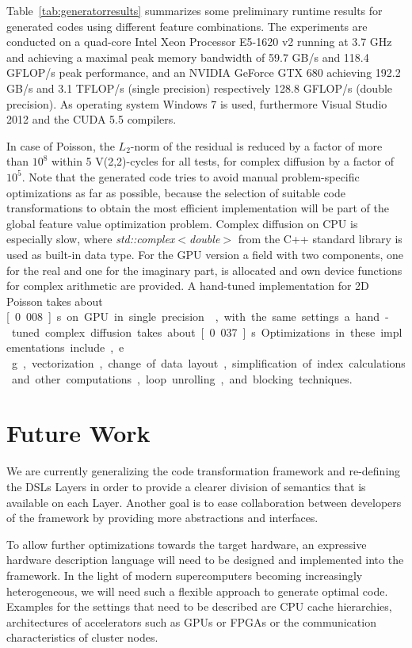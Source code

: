 \documentclass[onecolumn]{svjour3}
\begin{document}
Table~\ref{tab:generatorresults} summarizes some preliminary runtime results for generated codes using different feature combinations.
The experiments are conducted on a quad-core Intel Xeon Processor E5-1620 v2 running at 3.7 GHz and achieving a maximal peak memory bandwidth of 59.7 GB/s and 118.4 GFLOP/s peak performance, and an NVIDIA GeForce GTX 680 achieving 192.2 GB/s and 3.1 TFLOP/s (single precision) respectively 128.8 GFLOP/s (double precision). 
As operating system Windows 7 is used, furthermore Visual Studio 2012 and the CUDA 5.5 compilers.

In case of Poisson, the $L_2$-norm of the residual is reduced by a factor of more than $10^8$ within 5 V(2,2)-cycles for all tests,
for complex diffusion by a factor of $10^5$. Note that the generated code tries to avoid manual problem-specific optimizations as far as possible, because the selection of suitable code transformations to obtain the most efficient implementation will be part of the global feature value optimization problem. Complex diffusion on CPU is especially slow, where \textit{std::complex$<$double$>$} from the C++ standard library is used as built-in data type. For the GPU version a field with two components, one for the real and one for the imaginary part, is allocated and own device functions for complex arithmetic are provided.
A hand-tuned implementation for 2D Poisson takes about \unit[0.008]{s} on GPU in single precision~\cite{koestler13HDR}, with the same settings a hand-tuned complex diffusion takes about \unit[0.037]{s}. Optimizations in these implementations include, e.\,g., vectorization, change of data layout, simplification of index calculations and other computations, loop unrolling, and blocking techniques. 
 



\section{Future Work}
\label{sec:conclusion}

We are currently generalizing the code transformation framework and re-defining the \acp{DSL} Layers in order to provide a clearer division of semantics that is available on each Layer.
Another goal is to ease collaboration between developers of the framework by providing more abstractions and interfaces.

To allow further optimizations towards the target hardware, an expressive hardware description language will need to be designed and implemented into the framework.
In the light of modern supercomputers becoming increasingly heterogeneous, we will need such a flexible approach to generate optimal code.
Examples for the settings that need to be described are CPU cache hierarchies, architectures of accelerators such as GPUs or \acp{FPGA} or the communication characteristics of cluster nodes.
\end{document}
